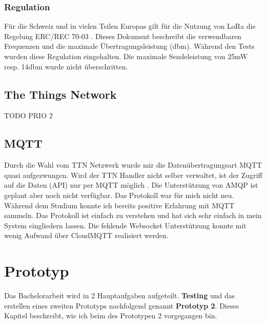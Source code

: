 \documentclass[11pt,english,german]{report}
\theoremstyle{definition}
\begin{document}
\subsection{Regulation}
Für die Schweiz und in vielen Teilen Europas gilt für die Nutzung von LoRa die Regelung ERC/REC 70-03 \cite{regulations}. Dieses Dokument beschreibt die verwendbaren Frequenzen und die maximale Übertragungsleistung (dbm). Während den Tests wurden diese Regulation eingehalten. Die maximale Sendeleistung von 25mW resp. 14dbm wurde nicht überschritten.

\newpage
\section{The Things Network}
TODO PRIO 2

\newpage
\section{MQTT}
Durch die Wahl vom TTN Netzwerk wurde mir die Datenübertragungsart MQTT quasi aufgezwungen. Wird der TTN Handler nicht selber verwaltet, ist der Zugriff auf die Daten (API) nur per MQTT möglich  \cite{amqp}. Die Unterstützung von AMQP ist geplant aber noch nicht verfügbar. Das Protokoll war für mich nicht neu. Während dem Studium konnte ich bereits positive Erfahrung mit MQTT sammeln. Das Protokoll ist einfach zu verstehen und hat sich sehr einfach in mein System eingliedern lassen. Die fehlende Websocket Unterstützung konnte mit wenig Aufwand über CloudMQTT realisiert werden.

\chapter{Prototyp}
Das Bachelorarbeit wird in 2 Hauptaufgaben aufgeteilt.\textbf{ Testing} und das erstellen eines zweiten Prototyps nachfolgend genannt \textbf{Prototyp 2}. Dieses Kapitel beschreibt, wie ich beim des Prototypen 2 vorgegangen bin.
\end{document}
